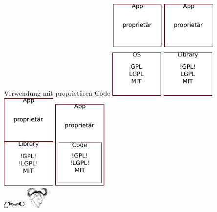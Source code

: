 \begin{frame}{Verwendung mit proprietären Code}
	\includegraphics[width=0.2\textwidth]{res/propritary-on-os.pdf}
	\hfill
	\includegraphics[width=0.2\textwidth]{res/propritary-dynamic-linking.pdf}
	\hfill
	\includegraphics[width=0.2\textwidth]{res/propritary-static-linking.pdf}
	\hfill
	\includegraphics[width=0.2\textwidth]{res/propritary-use-code.pdf}
	\\
	\includegraphics[width=3em]{res/open-handcuffs.pdf}
	\includegraphics[width=3em]{res/gnu-head.pdf}
\end{frame}
